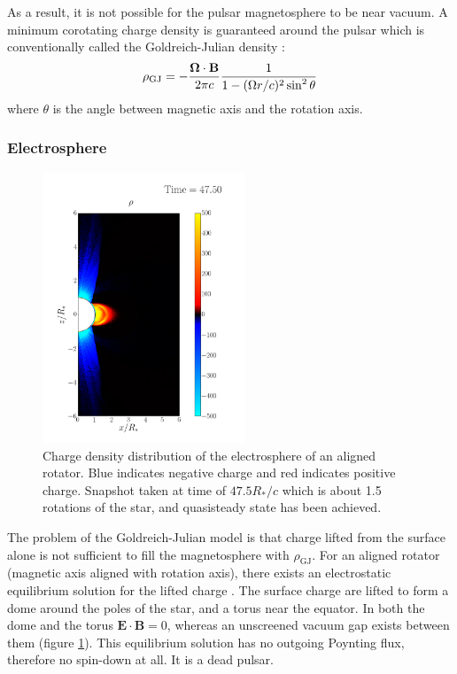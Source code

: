As a result, it is not possible for the pulsar magnetosphere to be near vacuum.
A minimum corotating charge density is guaranteed around the pulsar which is
conventionally called the Goldreich-Julian density \citep{goldreich_pulsar_1969}:
\begin{equation}
  \label{eq:gj-density}
  \rho_\mathrm{GJ} = -\frac{\bm{\Omega}\cdot \mathbf{B}}{2\pi c}\frac{1}{1 - (\Omega r/c)^2\sin^{2}\theta}
\end{equation}
where $\theta$ is the angle between magnetic axis and the rotation axis.

\subsubsection{Electrosphere}
\label{sec:electrosphere}

\begin{figure}[h]
  \centering
  \includegraphics[width=0.54\textwidth]{pics/intro/electrosphere-new.png}
  \caption[Charge density distribution of the electrosphere of an aligned
  rotator.]{Charge density distribution of the electrosphere of an aligned
    rotator. Blue indicates negative charge and red indicates positive charge.
    Snapshot taken at time of $47.5R_{*}/c$ which is about 1.5 rotations of the
    star, and quasisteady state has been achieved.}
  \label{fig:electrosphere-intro}
\end{figure}

The problem of the Goldreich-Julian model is that charge lifted from the
surface alone is not sufficient to fill the magnetosphere with
$\rho_\mathrm{GJ}$. For an aligned rotator (magnetic axis aligned with rotation
axis), there exists an electrostatic equilibrium solution for the lifted charge
\citep{jackson_new_1976, krause-polstorff_pulsar_1985,
  krause-polstorff_electrosphere_1985}. The surface charge are lifted to form a
dome around the poles of the star, and a torus near the equator. In both the
dome and the torus $\mathbf{E}\cdot \mathbf{B} = 0$, whereas an unscreened
vacuum gap exists between them (figure \ref{fig:electrosphere-intro}). This
equilibrium solution has no outgoing Poynting flux, therefore no spin-down at
all. It is a dead pulsar.

